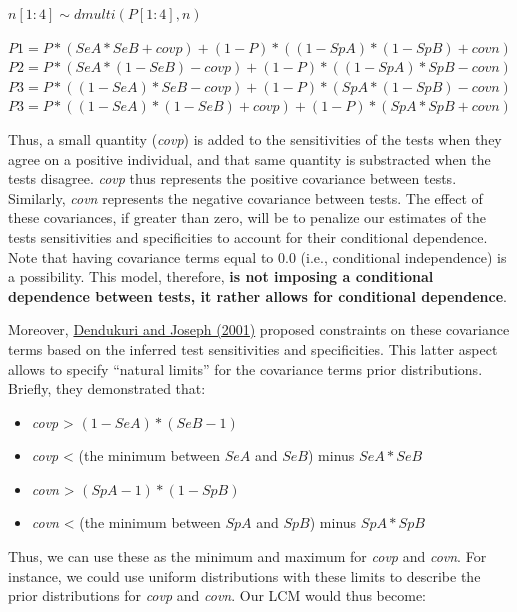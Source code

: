 \documentclass[
]{book}
\providecommand{\tightlist}{%
  \setlength{\itemsep}{0pt}\setlength{\parskip}{0pt}}
\begin{document}
\(n[1:4] \sim dmulti(P[1:4], n)\)

\(P1 = P*(SeA*SeB+covp) + (1-P)*((1-SpA)*(1-SpB)+covn)\)\\
\(P2 = P*(SeA*(1-SeB)-covp) + (1-P)*((1-SpA)*SpB-covn)\)\\
\(P3 = P*((1-SeA)*SeB-covp) + (1-P)*(SpA*(1-SpB)-covn)\)\\
\(P3 = P*((1-SeA)*(1-SeB)+covp) + (1-P)*(SpA*SpB+covn)\)

Thus, a small quantity (\emph{covp}) is added to the sensitivities of the tests when they agree on a positive individual, and that same quantity is substracted when the tests disagree. \emph{covp} thus represents the positive covariance between tests. Similarly, \emph{covn} represents the negative covariance between tests. The effect of these covariances, if greater than zero, will be to penalize our estimates of the tests sensitivities and specificities to account for their conditional dependence. Note that having covariance terms equal to 0.0 (i.e., conditional independence) is a possibility. This model, therefore, \textbf{is not imposing a conditional dependence between tests, it rather allows for conditional dependence}.

Moreover, \href{https://onlinelibrary.wiley.com/doi/10.1111/j.0006-341X.2001.00158.x}{Dendukuri and Joseph (2001)} proposed constraints on these covariance terms based on the inferred test sensitivities and specificities. This latter aspect allows to specify ``natural limits'' for the covariance terms prior distributions. Briefly, they demonstrated that:

\begin{itemize}
\tightlist
\item
  \emph{covp} \textgreater{} \((1-SeA)*(SeB-1)\)\\
\item
  \emph{covp} \textless{} (the minimum between \(SeA\) and \(SeB\)) minus \(SeA*SeB\)\\
\item
  \emph{covn} \textgreater{} \((SpA-1)*(1-SpB)\)\\
\item
  \emph{covn} \textless{} (the minimum between \(SpA\) and \(SpB\)) minus \(SpA*SpB\)
\end{itemize}

Thus, we can use these as the minimum and maximum for \emph{covp} and \emph{covn}. For instance, we could use uniform distributions with these limits to describe the prior distributions for \emph{covp} and \emph{covn}. Our LCM would thus become:
\end{document}
